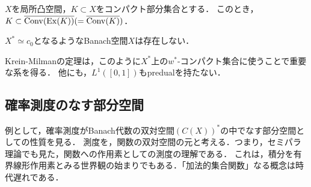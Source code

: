 \documentclass[uplatex,dvipdfmx]{jsreport}
\begin{document}
\begin{theorem}
    $X$を局所凸空間，$K\subset X$をコンパクト部分集合とする．
    このとき，$K\subset\overline{\mathrm{Conv}(\mathrm{Ex}(K))}(=\overline{\mathrm{Conv}(K)})$．
\end{theorem}

\begin{corollary}\label{cor-predual-of-c0}
    $X^*\simeq c_0$となるようなBanach空間$X$は存在しない．
\end{corollary}
\begin{remarks}
    Krein-Milmanの定理は，このように$X^*$上の$w^*$-コンパクト集合に使うことで重要な系を得る．
    他にも，$L^1([0,1])$もpredualを持たない．
\end{remarks}

\subsection{確率測度のなす部分空間}

\begin{tcolorbox}[colframe=ForestGreen, colback=ForestGreen!10!white,breakable,colbacktitle=ForestGreen!40!white,coltitle=black,fonttitle=\bfseries\sffamily,
title=]
    例として，確率測度がBanach代数の双対空間$(C(X))^*$の中でなす部分空間としての性質を見る．
    測度を，関数の双対空間の元と考える．つまり，セミパラ理論でも見た，関数への作用素としての測度の理解である．
    これは，積分を有界線形作用素とみる世界観の始まりでもある．「加法的集合関数」なる概念は時代遅れである．
\end{tcolorbox}
\end{document}
